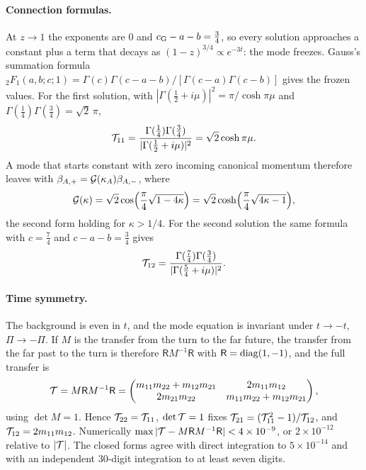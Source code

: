 \paragraph{Connection formulas.}
At $z\to1$ the exponents are $0$ and $c_{\rm G}-a-b=\tfrac34$, so every solution approaches a constant plus a term that decays as $(1-z)^{3/4}\propto e^{-3t}$: the mode freezes.
Gauss's summation formula ${}_2F_1(a,b;c;1)=\Gamma(c)\Gamma(c-a-b)/[\Gamma(c-a)\Gamma(c-b)]$ gives the frozen values.
For the first solution, with $|\Gamma(\tfrac12+i\mu)|^2=\pi/\cosh\pi\mu$ and $\Gamma(\tfrac14)\Gamma(\tfrac34)=\sqrt2\,\pi$,
\begin{equation}
\mathcal{T}_{11}=\frac{\Gamma(\tfrac14)\Gamma(\tfrac34)}{|\Gamma(\tfrac12+i\mu)|^2}=\sqrt2\cosh\pi\mu .
\end{equation}
A mode that starts constant with zero incoming canonical momentum therefore leaves with $\beta_{A,+}=\mathcal{G}(\kappa_A)\beta_{A,-}$, where
\begin{equation}
\mathcal{G}(\kappa)=\sqrt2\cos\!\Big(\frac\pi4\sqrt{1-4\kappa}\Big)=\sqrt2\cosh\!\Big(\frac\pi4\sqrt{4\kappa-1}\Big),
\label{eq:rA-gain}
\end{equation}
the second form holding for $\kappa>1/4$.
For the second solution the same formula with $c=\tfrac74$ and $c-a-b=\tfrac34$ gives
\begin{equation}
\mathcal{T}_{12}=\frac{\Gamma(\tfrac74)\Gamma(\tfrac34)}{|\Gamma(\tfrac54+i\mu)|^2}.
\label{eq:rA-T12}
\end{equation}

\paragraph{Time symmetry.}
The background is even in $t$, and the mode equation is invariant under $t\to-t$, $\Pi\to-\Pi$.
If $M$ is the transfer from the turn to the far future, the transfer from the far past to the turn is therefore $\mathsf RM^{-1}\mathsf R$ with $\mathsf R={\rm diag}(1,-1)$, and the full transfer is
\begin{equation}
\mathcal{T}=M\mathsf RM^{-1}\mathsf R
=\begin{pmatrix}m_{11}m_{22}+m_{12}m_{21}&2m_{11}m_{12}\\2m_{21}m_{22}&m_{11}m_{22}+m_{12}m_{21}\end{pmatrix},
\label{eq:rA-Tsym}
\end{equation}
using $\det M=1$.
Hence $\mathcal{T}_{22}=\mathcal{T}_{11}$, $\det\mathcal{T}=1$ fixes $\mathcal{T}_{21}=(\mathcal{T}_{11}^2-1)/\mathcal{T}_{12}$, and $\mathcal{T}_{12}=2m_{11}m_{12}$.
Numerically $\max|\mathcal{T}-M\mathsf RM^{-1}\mathsf R|<4\times10^{-9}$, or $2\times10^{-12}$ relative to $|\mathcal{T}|$. %
The closed forms agree with direct integration to $5\times10^{-14}$ and with an independent 30-digit integration to at least seven digits. %

